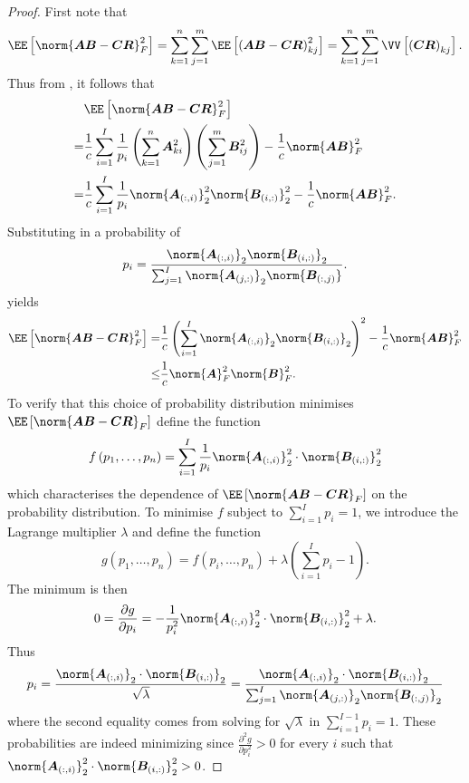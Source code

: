 \begin{proof}
    First note that
    \[
        \EE \left[ \norm{\bm{A} \bm{B} - \bm{C} \bm{R}}_{F}^{2} \right]
        = \sum_{k=1}^{n} \sum_{j=1}^{m} \EE \left[ \left( \bm{A} \bm{B} - \bm{C} \bm{R}\right)_{kj}^{2} \right]
        = \sum_{k=1}^{n} \sum_{j=1}^{m} \VV \left[ \left( \bm{C} \bm{R} \right)_{kj} \right].
    \]
    Thus from , it follows that
    \begin{align*}
          & \EE \left[ \norm{\bm{A} \bm{B} - \bm{C} \bm{R}}^2_F \right]                                                                                                                     \\
        = & \frac{1}{c} \sum_{i=1}^{I} \frac{1}{p_i} \left( \sum_{k=1}^{n} \bm{A}_{ki}^{2} \right) \left( \sum_{j=1}^{m} \bm{B}_{ij}^{2} \right) - \frac{1}{c} \norm{\bm{A} \bm{B}}_{F}^{2} \\
        = & \frac{1}{c} \sum_{i=1}^{I} \frac{1}{p_i} \norm{\bm{A}_{(:,i)}}_{2}^{2} \norm{\bm{B}_{(i,:)}}_{2}^{2} - \frac{1}{c} \norm{\bm{A} \bm{B}}_{F}^{2}.
    \end{align*}
    Substituting in a probability of
    \[
        p_i = \frac{\norm{\bm{A}_{(:,i)}}_2 \norm{\bm{B}_{(i,:)}}_2}{\sum_{j=1}^{I} \norm{\bm{A}_{(j,:)}}_2 \norm{\bm{B}_{(:,j)}}}.
    \]
    yields
    \begin{align*}
        \EE \left[ \norm{\bm{A} \bm{B} - \bm{C} \bm{R}}^2_F \right] = & \frac{1}{c} \left( \sum_{i=1}^{I} \norm{\bm{A}_{(:,i)}}_{2} \norm{\bm{B}_{(i,:)}}_{2} \right)^{2} - \frac{1}{c} \norm{\bm{A} \bm{B}}_{F}^{2} \\
        \leq                                                          & \frac{1}{c} \norm{\bm{A}}^2_{F} \norm{\bm{B}}^2_{F}.
    \end{align*}
    To verify that this choice of probability distribution minimises $\EE \left[ \norm{\bm{A} \bm{B} - \bm{C} \bm{R}}_{F} \right]$ define the function
    \[
        f \left( p_1 , \ldots , p_n \right) = \sum_{i=1}^{I} \frac{1}{p_i} \norm{\bm{A}_{(:,i)}}_{2}^{2} \cdot \norm{\bm{B}_{(i,:)}}_{2}^{2}
    \]
    which characterises the dependence of $\EE \left[ \norm{\bm{A} \bm{B} - \bm{C} \bm{R}}_{F} \right]$ on the probability distribution. To minimise $f$ subject to $\sum_{i=1}^{I} p_i = 1$, we introduce the Lagrange multiplier $\lambda$ and define the function
    \[
        g \left( p_1 , \ldots , p_n \right) = f \left( p_i , \ldots , p_n \right) + \lambda \left( \sum_{i=1}^{I} p_i - 1 \right).
    \]
    The minimum is then
    \[
        0 = \frac{\partial g}{\partial p_i} = - \frac{1}{p_i^2} \norm{\bm{A}_{(:,i)}}_{2}^{2} \cdot \norm{\bm{B}_{(i,:)}}_{2}^{2} + \lambda.
    \]
    Thus
    \[
        p_i = \frac{\norm{\bm{A}_{(:,i)}}_{2} \cdot \norm{\bm{B}_{(i,:)}}_{2}}{\sqrt{\lambda}} = \frac{\norm{\bm{A}_{(:,i)}}_{2} \cdot \norm{\bm{B}_{(i,:)}}_{2}}{\sum_{j=1}^{I} \norm{\bm{A}_{(j,:)}}_{2} \norm{\bm{B}_{(:,j)}}_{2}}
    \]
    where the second equality comes from solving for $\sqrt{\lambda}$ in $\sum_{i=1}^{I-1} p_i = 1$. These probabilities are indeed minimizing since $\frac{\partial^2 g}{\partial p_i^2} > 0$ for every $i$ such that $\norm{\bm{A}_{(:,i)}}_{2}^{2} \cdot \norm{\bm{B}_{(i,:)}}_{2}^{2} > 0$.
\end{proof}